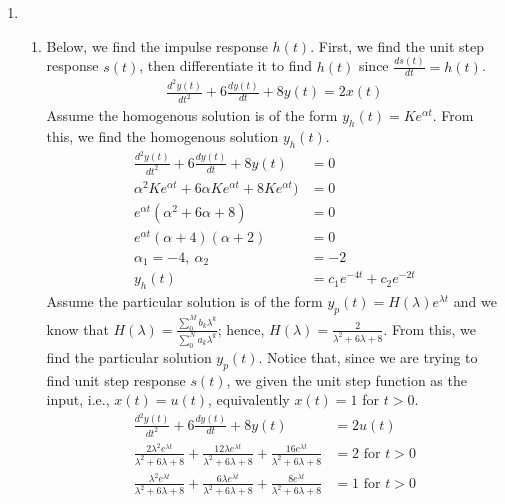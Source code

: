 \documentclass[10pt,a4paper, margin=1in]{article}
\begin{document}
\begin{enumerate}
\item 
    \begin{enumerate}
    \item Below, we find the impulse response $h(t)$. First, we find the unit step response $s(t)$, then differentiate it to find $h(t)$ since $\frac{ds(t)}{dt} = h(t)$.
    	\begin{equation}
	\begin{split}
		\frac{d^2y(t)}{dt^2} + 	6\frac{dy(t)}{dt} + 8y(t) = 2x(t)
	\end{split}
	\end{equation}
	Assume the homogenous solution is of the form $y_h(t) = Ke^{\alpha t}$. From this, we find the homogenous solution $y_h(t)$.
    	\begin{equation}
	\begin{split}
		\frac{d^2y(t)}{dt^2} + 	6\frac{dy(t)}{dt} + 8y(t) & = 0\\
		\alpha^2Ke^{\alpha t} + 6\alpha Ke^{\alpha t} + 8 Ke^{\alpha t}) & = 0\\
		 e^{\alpha t} (\alpha^2 + 6\alpha + 8) & = 0\\
		 e^{\alpha t} (\alpha + 4) (\alpha + 2) & = 0\\
		 \alpha_1 = -4, \  \alpha_2 & = -2\\
		 y_h(t) & = c_1 e^{-4 t} + c_2 e^{-2 t}
	\end{split}
	\end{equation}
	Assume the particular solution is of the form $y_p(t) = H(\lambda)e^{\lambda t}$ and we know that $H(\lambda) = \frac{\sum_{0}^{M} b_k \lambda^k}{\sum_{0}^{N} a_k \lambda^k}$; hence, $H(\lambda) = \frac{2}{\lambda^2 + 6\lambda + 8}$. From this, we find the particular solution $y_p(t)$. Notice that, since we are trying to find unit step response $s(t)$, we given the unit step function as the input, i.e.,  $x(t) = u(t)$, equivalently $x(t) = 1$ for $t > 0$.
    	\begin{equation}
	\begin{split}
		\frac{d^2y(t)}{dt^2} + 	6\frac{dy(t)}{dt} + 8y(t) & = 2 u(t)\\
		\frac{2\lambda^2 e^{\lambda t}}{\lambda^2 + 6\lambda + 8} + \frac{12\lambda e^{\lambda t}}{\lambda^2 + 6\lambda + 8} + \frac{16 e^{\lambda t}}{\lambda^2 + 6\lambda + 8}  & = 2 \text{ for } t > 0\\
		\frac{\lambda^2 e^{\lambda t}}{\lambda^2 + 6\lambda + 8} + \frac{6\lambda e^{\lambda t}}{\lambda^2 + 6\lambda + 8} + \frac{8 e^{\lambda t}}{\lambda^2 + 6\lambda + 8}  & = 1 \text{ for } t > 0\\

\end{split}
\end{equation}
\end{enumerate}
\end{enumerate}
\end{document}
